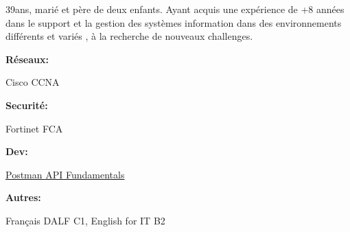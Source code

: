 \documentclass[9pt]{developercv} %
\begin{document}
\begin{minipage}[t]{0.46\textwidth}
	\vspace{-6pt}
 
	39ans, marié et père de deux enfants. Ayant acquis une expérience de
    +8 années dans le support et la gestion des systèmes information dans des environnements différents et variés
    , à la recherche de nouveaux challenges.\\
\end{minipage}
\hfill %
\begin{minipage}[t]{0.465\textwidth}
    \vspace{-6pt}
    
    \begin{minipage}[t]{0.2\textwidth}
        \textbf{Réseaux:}
    \end{minipage}
    \hfill
    \begin{minipage}[t]{1.5\textwidth}
      Cisco CCNA
    \end{minipage}

    \begin{minipage}[t]{0.2\textwidth}
        \textbf{Securité:}
    \end{minipage}
    \hfill
    \begin{minipage}[t]{1.5\textwidth}
      Fortinet FCA
    \end{minipage}

    \begin{minipage}[t]{0.2\textwidth}
        \textbf{Dev:}
    \end{minipage}
    \hfill
    \begin{minipage}[t]{1.5\textwidth}
          {\href{https://api.badgr.io/public/assertions/AcGpQScPRACCJTSK9TcjJw?identity__email=achraf.elouanzi%40gmail.com}
      {Postman API Fundamentals}}
    \end{minipage}

    \begin{minipage}[t]{0.2\textwidth}
        \textbf{Autres:}
    \end{minipage}
    \hfill
    \begin{minipage}[t]{1.5\textwidth}
      Français DALF C1, English for IT B2
    \end{minipage}

\end{minipage}
\end{document}
